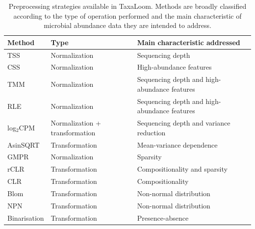 \documentclass[pdflatex,sn-vancouver-num]{sn-jnl}%
\theoremstyle{thmstyleone}%
\theoremstyle{thmstyletwo}%
\theoremstyle{thmstylethree}%
\begin{document}
\begin{table}[ht]
\centering
\caption{Preprocessing strategies available in TaxaLoom. Methods are broadly classified according to the type of operation performed and the main characteristic of microbial abundance data they are intended to address.}
\label{tab:preprocessing}

\setlength{\tabcolsep}{4pt}
\renewcommand{\arraystretch}{1.2}

\begin{tabular}{
>{\raggedright\arraybackslash}p{2.0cm}
>{\raggedright\arraybackslash}p{3.4cm}
>{\raggedright\arraybackslash}p{6.0cm}
}
\toprule
\textbf{Method} & \textbf{Type} & \textbf{Main characteristic addressed} \\
\midrule
TSS                                     & Normalization                  & Sequencing depth \\

CSS \citep{paulson_differential_2013}   & Normalization                  & High-abundance features \\
TMM \citep{robinson_scaling_2010}       & Normalization                  & Sequencing depth and high-abundance features \\
RLE \citep{anders_differential_2010}    & Normalization                  & Sequencing depth and high-abundance features \\
log$_2$CPM                              & Normalization + transformation & Sequencing depth and variance reduction \\

AsinSQRT                                & Transformation                 & Mean-variance dependence \\
GMPR \citep{chen_gmpr_2018}             & Normalization                  & Sparsity \\

rCLR \citep{martino_novel_2019}         & Transformation                 & Compositionality and sparsity \\
CLR \citep{aitchison_statistical_1982}  & Transformation                 & Compositionality \\

Blom \citep{blom_statistical_1958}      & Transformation                 & Non-normal distribution \\
NPN \citep{liu_nonparanormal_2009}      & Transformation                 & Non-normal distribution \\

Binarisation                            & Transformation                 & Presence-absence \\
\bottomrule
\end{tabular}

\end{table}
\end{document}
